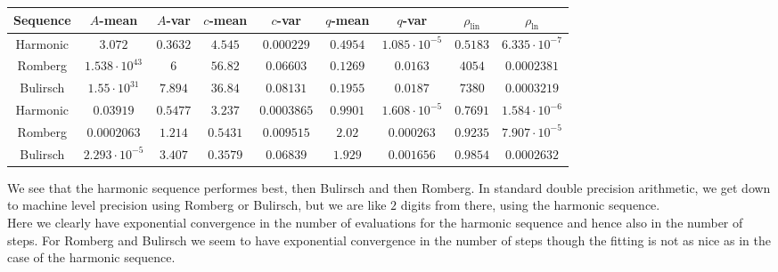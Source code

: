 \begin{table}[H]
    \centering
    \small
    \begin{tabular}{c||c|c|c|c|c|c|c|c}
Sequence & \(A\)-mean & \(A\)-var & \(c\)-mean & \(c\)-var & \(q\)-mean & \(q\)-var & \(\rho_{\operatorname{lin}}\) & \(\rho_{\ln}\)\\\hline
\rowcolor{green}
Harmonic & \(3.072\) & \(0.3632\) & \(4.545\) & \(0.000229\) & \(0.4954\) & \(1.085\cdot 10^{-5}\) & \(0.5183\) & \(6.335\cdot 10^{-7}\) \\
\rowcolor{red}
Romberg & \(1.538\cdot 10^{43}\) & \(6\) & \(56.82\) & \(0.06603\) & \(0.1269\) & \(0.0163\) & \(4054\) & \(0.0002381\) \\
\rowcolor{red}
Bulirsch & \(1.55\cdot 10^{31}\) & \(7.894\) & \(36.84\) & \(0.08131\) & \(0.1955\) & \(0.0187\) & \(7380\) & \(0.0003219\) \\
\rowcolor{green}
Harmonic & \(0.03919\) & \(0.5477\) & \(3.237\) & \(0.0003865\) & \(0.9901\) & \(1.608\cdot 10^{-5}\) & \(0.7691\) & \(1.584\cdot 10^{-6}\) \\
\rowcolor{yellow}
Romberg & \(0.0002063\) & \(1.214\) & \(0.5431\) & \(0.009515\) & \(2.02\) & \(0.000263\) & \(0.9235\) & \(7.907\cdot 10^{-5}\) \\
\rowcolor{yellow}
Bulirsch & \(2.293\cdot 10^{-5}\) & \(3.407\) & \(0.3579\) & \(0.06839\) & \(1.929\) & \(0.001656\) & \(0.9854\) & \(0.0002632\) \\
    \end{tabular}
    \label{tab:my_label}
\end{table}

We see that the harmonic sequence performes best, then Bulirsch and then Romberg. In standard double precision arithmetic, we get down to machine level precision using Romberg or Bulirsch, but we are like \(2\) digits from there, using the harmonic sequence.\\

Here we clearly have exponential convergence in the number of evaluations for the harmonic sequence and hence also in the number of steps. For Romberg and Bulirsch we seem to have exponential convergence in the number of steps though the fitting is not as nice as in the case of the harmonic sequence.

